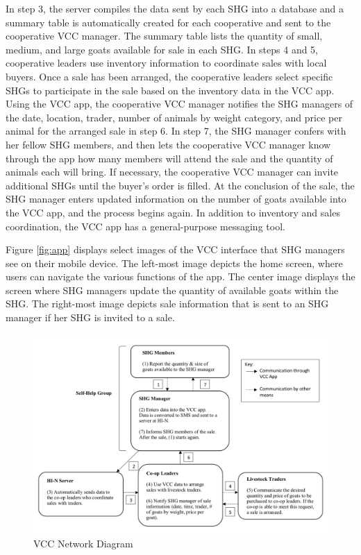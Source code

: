\documentclass[11pt]{article}
\begin{document}
In step 3, the server compiles the data sent by each SHG into a database and a summary table is automatically created for each cooperative and sent to the cooperative VCC manager. The summary table lists the quantity of small, medium, and large goats available for sale in each SHG. In steps 4 and 5, cooperative leaders use inventory information to coordinate sales with local buyers. Once a sale has been arranged, the cooperative leaders select specific SHGs to participate in the sale based on the inventory data in the VCC app. Using the VCC app, the cooperative VCC manager notifies the SHG managers of the date, location, trader, number of animals by weight category, and price per animal for the arranged sale in step 6. In step 7, the SHG manager confers with her fellow SHG members, and then lets the cooperative VCC manager know through the app how many members will attend the sale and the quantity of animals each will bring. If necessary, the cooperative VCC manager can invite additional SHGs until the buyer's order is filled. At the conclusion of the sale, the SHG manager enters updated information on the number of goats available into the VCC app, and the process begins again. In addition to inventory and sales coordination, the VCC app has a general-purpose messaging tool.

Figure \ref{fig:app} displays select images of the VCC interface that SHG managers see on their mobile device. The left-most image depicts the home screen, where users can navigate the various functions of the app. The center image displays the screen where SHG managers update the quantity of available goats within the SHG. The right-most image depicts sale information that is sent to an SHG manager if her SHG is invited to a sale.

\newpage

\begin{figure}[!h]
    \caption{VCC Network Diagram}
    \label{fig:diagram}
    \noindent \centering \includegraphics[width=.8\textwidth]{VCCdiagram.png}
\end{figure}
\end{document}
